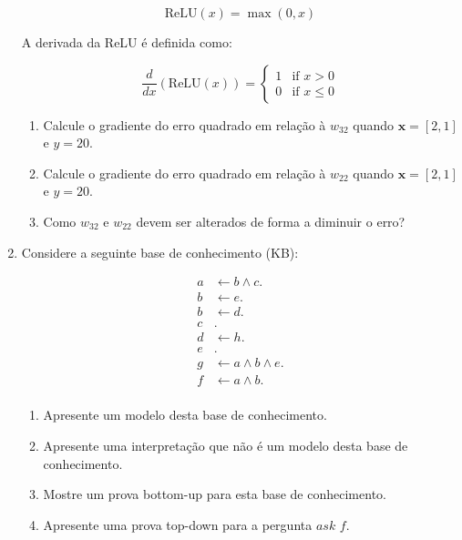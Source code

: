 \documentclass{article}
\begin{document}
\begin{enumerate}
    \begin{equation}
        \text{ReLU}(x) = \max(0, x)
    \end{equation}

    A derivada da ReLU é definida como:

    \begin{equation}
            \frac{d}{dx}(\text{ReLU}(x)) =
            \begin{cases}
            1 & \text{if } x > 0 \\
            0 & \text{if } x \leq 0
            \end{cases}            
    \end{equation}


    \begin{enumerate}
        \item Calcule o gradiente do erro quadrado em relação à $w_{32}$ quando $\mathbf{x} = [2,1]$ e $y = 20$.
        \item Calcule o gradiente do erro quadrado em relação à $w_{22}$ quando $\mathbf{x} = [2,1]$ e $y = 20$. 
        \item Como $w_{32}$ e $w_{22}$ devem ser alterados de forma a diminuir o erro?   
    \end{enumerate}
    
    \item Considere a seguinte base de conhecimento (KB):
    \vspace{-0.5 cm}
    
    \begin{center}
        \begin{align*}
         a & \leftarrow b \wedge c. \\ 
         b & \leftarrow e. \\ 
         b & \leftarrow d. \\ 
         c &. \\ 
         d & \leftarrow h. \\ 
         e &. \\
         g & \leftarrow a \wedge b  \wedge e. \\
         f & \leftarrow a \wedge b. \\  
        \end{align*}
    \end{center}
    
    
    \begin{enumerate} 
        \item Apresente um modelo desta base de conhecimento.
        \item Apresente uma interpretação que não é um modelo desta base de conhecimento.
        \item Mostre um prova bottom-up para esta base de conhecimento. 
        \item Apresente uma prova top-down para a pergunta $ask$ $f$.
    \end{enumerate}
    
    \end{enumerate}
\end{document}
